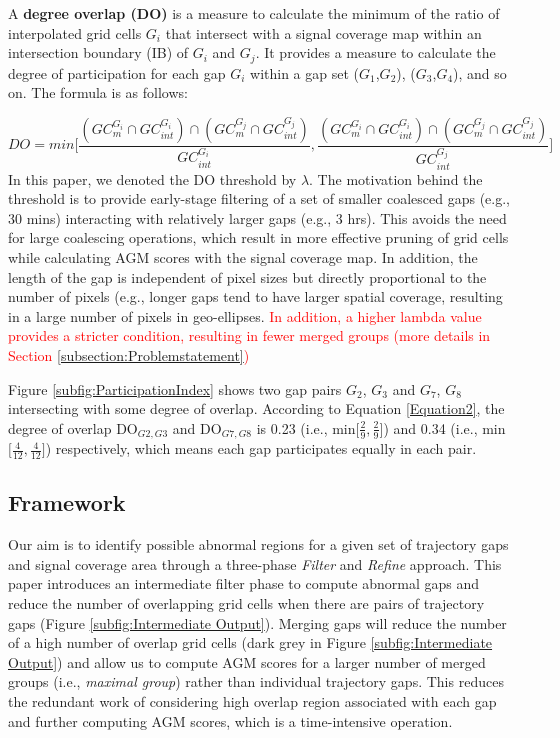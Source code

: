 \documentclass[acmsmall]{acmart}
\begin{document}
\begin{definition}
\label{definition:PR}
A \textbf{degree overlap (DO)} is a measure to calculate the minimum of the ratio of interpolated grid cells $G_{i}$ that intersect with a signal coverage map within an intersection boundary (IB) of $G_{i}$ and $G_{j}$. It provides a measure to calculate the degree of participation for each gap $G_{i}$ within a gap set ($G_{1}$,$G_{2}$),  ($G_{3}$,$G_{4}$), and so on. The formula is as follows:
\end{definition}
\begin{equation}
\label{Equation2}
DO = min\lbrack\frac{{(GC_{m}^{G_{i}} \cap GC_{int}^{G_{i}})} \cap ({GC_{m}^{G_{j}} \cap GC_{int}^{G_{j}}})}{GC_{int}^{G_{i}}},\frac{{(GC_{m}^{G_{i}} \cap GC_{int}^{G_{i}})} \cap ({GC_{m}^{G_{j}} \cap GC_{int}^{G_{j}}})}{GC_{int}^{G_{j}}}\rbrack
\end{equation}
In this paper, we denoted the DO threshold by \textbf{$\lambda$}. The motivation behind the threshold is to provide early-stage filtering of a set of smaller coalesced gaps (e.g., 30 mins) interacting with relatively larger gaps (e.g., 3 hrs). This avoids the need for large coalescing operations, which result in more effective pruning of grid cells while calculating AGM scores with the signal coverage map. In addition, the length of the gap is independent of pixel sizes but directly proportional to the number of pixels (e.g., longer gaps tend to have larger spatial coverage, resulting in a large number of pixels in geo-ellipses. \textcolor{red}{In addition, a higher lambda value provides a stricter condition, resulting in fewer merged groups (more details in Section \ref{subsection:Problemstatement})}

Figure \ref{subfig:ParticipationIndex} shows two gap pairs $G_{2}$, $G_{3}$ and $G_{7}$, $G_{8}$ intersecting with some degree of overlap. According to Equation \ref{Equation2}, the degree of overlap DO$_{G2,G3}$ and DO$_{G7,G8}$ is 0.23 (i.e., min$\lbrack\frac{2}{9},\frac{2}{9}\rbrack$) and 0.34 (i.e., min$\lbrack\frac{4}{12},\frac{4}{12}\rbrack$) respectively, which means each gap participates equally in each pair.

\subsection{Framework}
\label{subsection:FrameWork}

Our aim is to identify possible abnormal regions for a given set of trajectory gaps and signal coverage area through a three-phase \emph{Filter} and \emph {Refine} approach. This paper introduces an intermediate filter phase to compute abnormal gaps and reduce the number of overlapping grid cells when there are pairs of trajectory gaps (Figure \ref{subfig:Intermediate Output}). Merging gaps will reduce the number of a high number of overlap grid cells (dark grey in Figure \ref{subfig:Intermediate Output}) and allow us to compute AGM scores for a larger number of merged groups (i.e., \textit{maximal group}) rather than individual trajectory gaps. This reduces the redundant work of considering high overlap region associated with each gap and further computing AGM scores, which is a time-intensive operation. 
\end{document}
